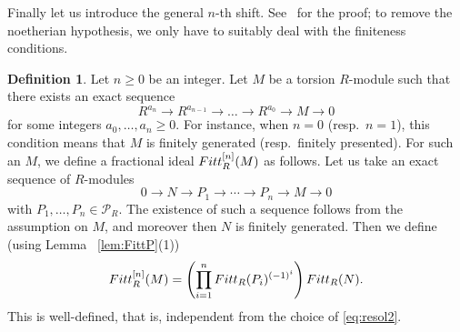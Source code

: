 \documentclass[11pt]{article}
\theoremstyle{definition}
\newtheorem{defi}[theo]{Definition}
\numberwithin{equation}{section}
\newcommand{\cP}{\mathcal{P}}
\newcommand{\Fitt}{{\rm Fitt}}
\begin{document}
Finally let us introduce the general $n$-th shift.
See~\cite[Theorem 2.6]{Kata_05} for the proof; to remove the noetherian hypothesis, we only have to suitably deal with the finiteness conditions.

\begin{defi}\label{defn:shift_n}
Let $n \geq 0$ be an integer.
Let $M$ be a torsion $R$-module such that there exists an exact sequence
\[
R^{a_n} \to R^{a_{n-1}} \to \dots \to R^{a_0} \to M \to 0
\]
for some integers $a_0, \dots, a_n \geq 0$.
For instance, when $n = 0$ (resp.~$n = 1$), this condition means that $M$ is finitely generated (resp.~finitely presented).
For such an $M$, we define a fractional ideal $\Fitt^{[n]}_R(M)$ as follows.
Let us take an exact sequence of $R$-modules
\begin{equation}\label{eq:resol2}
0 \to N \to P_1 \to \cdots \to P_n \to M \to 0
\end{equation}
with $P_1, \dots, P_n \in \cP_R$.
The existence of such a sequence follows from the assumption on $M$, and moreover then $N$ is finitely generated.
Then we define (using Lemma ~\ref{lem:FittP}(1))
\[
\Fitt^{[n]}_R(M) = \left( \prod_{i=1}^n \Fitt_R(P_i)^{(-1)^i} \right) \Fitt_R(N).
\]
This is well-defined, that is, independent from the choice of \eqref{eq:resol2}.
\end{defi}
 
\end{document}
